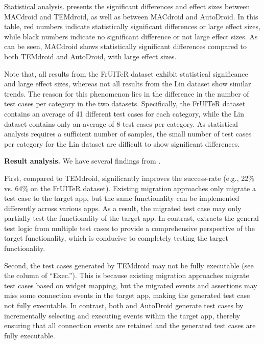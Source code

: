 \underline{Statistical analysis.} 
 presents the significant differences and effect sizes between MACdroid and TEMdroid, as well as between MACdroid and AutoDroid. In this table, red numbers indicate statistically significant differences or large effect sizes, while black numbers indicate no significant difference or not large effect sizes. As can be seen, MACdroid shows statistically significant differences compared to both TEMdroid and AutoDroid, with large effect sizes.

Note that, all results from the FrUITeR dataset exhibit statistical significance and large effect sizes, whereas not all results from the Lin dataset show similar trends. The reason for this phenomenon lies in the difference in the number of test cases per category in the two datasets. Specifically, the FrUITeR dataset contains an average of 41 different test cases for each category, while the Lin dataset contains only an average of 8 test cases per category. As statistical analysis requires a sufficient number of samples, the small number of test cases per category for the Lin dataset are difficult to show significant differences.



\textbf{Result analysis.}
We have several findings from .


First, compared to TEMdroid, \toolNameSmall{} significantly improves the success-rate (e.g., 22\% vs. 64\% on the FrUITeR dataset). 
Existing migration approaches only migrate a test case to the target app, but the same functionality can be implemented differently across various apps. As a result, the migrated test case may only partially test the functionality of the target app. In contrast, \toolNameSmall{} extracts the general test logic from multiple test cases to provide a comprehensive perspective of the target functionality, which is conducive to completely testing the target functionality.


Second, the test cases generated by TEMdroid may not be fully executable (see the column of ``Exec.''). This is because existing migration approaches migrate test cases based on widget mapping, but the migrated events and assertions may miss some connection events in the target app, making the generated test case not fully executable. 
In contrast, both \toolNameSmall{} and AutoDroid generate test cases by incrementally selecting and executing events within the target app, thereby ensuring that all connection events are retained and the generated test cases are fully executable.




